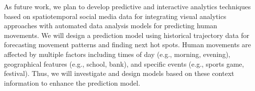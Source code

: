 As future work, we plan to develop predictive and interactive analytics techniques based on spatiotemporal social media data for integrating visual analytics approaches with automated data analysis models for predicting human movements.
We will design a prediction model using historical trajectory data for forecasting movement patterns and finding next hot spots.
Human movements are affected by multiple factors including times of day (e.g., morning, evening), geographical features (e.g., school, bank), and specific events (e.g., sports game, festival).
Thus, we will investigate and design models based on these context information to enhance the prediction model.





























